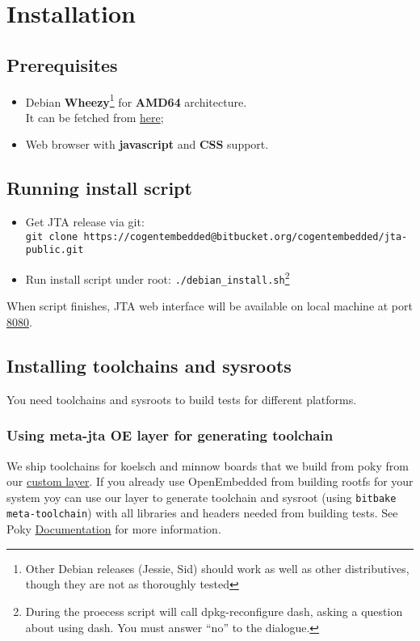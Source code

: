 \section{Installation}
\label{sec:install}

\subsection{Prerequisites}
\label{sec:prereq}

\begin{itemize}
\item Debian \textbf{Wheezy}\footnote{Other Debian releases (Jessie, Sid) should work as well as other distributives, though they are not as thoroughly tested} for \textbf{AMD64} architecture.  \\ It can be fetched from
  \href{``http://cdimage.debian.org/cdimage/jessie_di_alpha_1/amd64/iso-cd/debian-jessie-DI-a1-amd64-netinst.iso''}{here};
\item Web browser with \textbf{javascript} and \textbf{CSS} support.
\end{itemize}
\subsection{Running install script}
\label{sec:inst-steps}

\begin{itemize}
\item Get JTA release via git:
  \\ 
  \texttt{git clone https://cogentembedded@bitbucket.org/cogentembedded/jta-public.git}
\item Run install script under root: \texttt{./debian\_install.sh}\footnote{During the proecess script will call dpkg-reconfigure dash, asking a question about using dash. You must answer ``no'' to the dialogue.}

\end{itemize}


When script finishes, JTA web interface will be available on local machine at port \href{http://localhost:8080}{8080}.

\subsection{Installing toolchains and sysroots}
You need toolchains and sysroots to build tests for different platforms. 
\label{sec:toolchain-install}
\subsubsection{Using meta-jta OE layer for generating toolchain}
We ship toolchains for koelsch and minnow boards that we build from poky from our \href{https://bitbucket.org/cogentembedded/meta-jta/}{custom layer}. If you already use OpenEmbedded from building rootfs for your system yoy can use our layer to generate toolchain and sysroot (using \texttt{bitbake meta-toolchain}) with all libraries and headers needed from building tests. See Poky \href{http://www.yoctoproject.org/docs/1.6/adt-manual/adt-manual.html}{Documentation} for more information.

